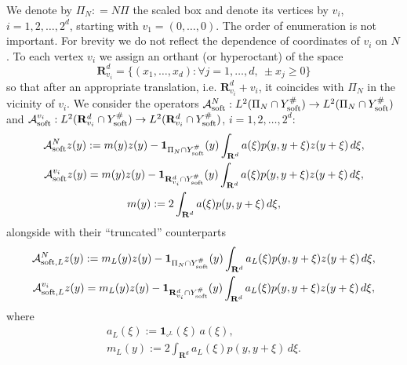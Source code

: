 \documentclass[11pt]{article}
\newcommand\soft{{\rm soft}}
\newcommand{\R}{\mathbf{R}}
\def\AA{\mathcal{A}}
\theoremstyle{remark}
\begin{document}
We denote by $\Pi_N: = N\Pi$ the scaled box and denote its vertices by $v_i$, $i=1,2,\ldots,2^d$, starting with $v_1 = (0,\dots,0)$. The order of enumeration is not important. For brevity we do not reflect the dependence of coordinates of $v_i$ on $N$.  To each vertex $v_i$ we assign an orthant (or hyperoctant) of the space
\begin{equation}\label{utoest5}
	\mathbf{R}^d_{v_i}=\{ (x_1,\dots,x_d): \forall j=1,\dots,d, \ \pm x_j \geq 0 \}
\end{equation} 	
so that after an appropriate translation, i.e. $\mathbf{R}^d_{v_i} + v_i$, it coincides with $\Pi_N$ in the vicinity of $v_i$.
We consider the operators $\mathcal{A}^N_\soft: L^2(\Pi_N\cap Y^\#_\soft )\to L^2(\Pi_N\cap Y^\#_\soft )$ and  $\AA_\soft^{v_i}: L^2(\mathbf{R}^d_{v_i}\cap Y_\soft^{\#}) \to L^2(\mathbf{R}^d_{v_i}\cap Y_\soft^{\#})$, $i=1,2,\ldots,2^d$:
\begin{equation*}%
\begin{gathered}
	\AA_\soft^N z (y) :=m(y)z(y)-\mathbf{1}_{\Pi_N\cap Y^\#_\soft}(y)\int_{\R^d} a(\xi) p(y,y+\xi)z(y+\xi) \, d\xi,
	\\
	\AA_\soft ^{v_i} z (y) =m(y)z(y)-\mathbf{1}_{\mathbf{R}^d_{v_i}\cap Y^\#_\soft}(y)\int_{\R^d} a(\xi) p(y,y+\xi)z(y+\xi) \, d\xi,
	\\
	m(y):=2\int_{\R^d} a(\xi) p(y,y+\xi)\,d\xi,
\end{gathered}
\end{equation*}
alongside with their ``truncated'' counterparts
\begin{equation*} %
	\begin{gathered}
		\AA_{\soft,L}^N z (y) :=m_L(y)z(y)-\mathbf{1}_{\Pi_N\cap Y^\#_\soft}(y)\int_{\R^d} a_L(\xi) p(y,y+\xi)z(y+\xi) \, d\xi,
\\
	\AA_{\soft,L} ^{v_i} z (y) =m_L(y)z(y)-\mathbf{1}_{\mathbf{R}^d_{v_i}\cap Y^\#_\soft}(y)\int_{\R^d} a_L(\xi) p(y,y+\xi)z(y+\xi) \, d\xi,
	\end{gathered}
	\end{equation*}
where
\begin{equation}\label{85}
	\begin{gathered}
	a_L(\xi):=\mathbf{1}_{\square^{L}}(\xi)\,a(\xi),
\\
m_L(y):=2\int_{\R^d} a_L(\xi) p(y,y+\xi)\,d\xi.
\end{gathered}
\end{equation}
\end{document}
